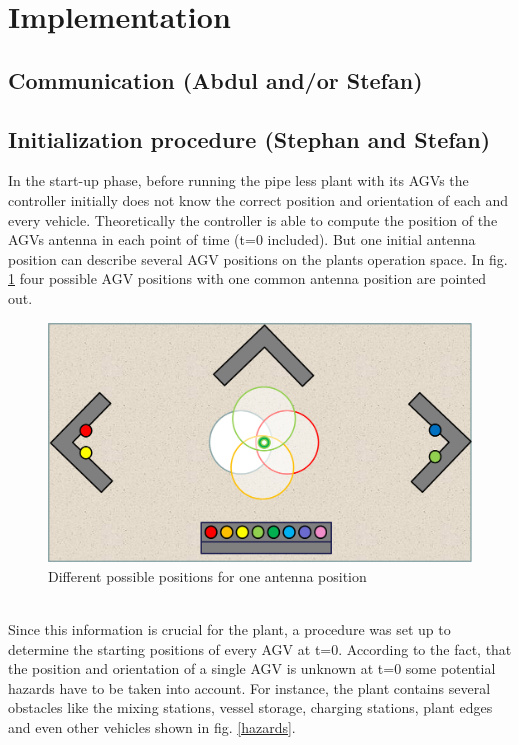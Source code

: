 \section{Implementation}\label{Sec_Imp}

\subsection{Communication (Abdul and/or Stefan)}

\subsection{Initialization procedure (Stephan and Stefan)}\label{Sec_Imp_Ini}
In the start-up phase, before running the pipe less plant with its AGVs the controller initially does not know the correct position and orientation of each and every vehicle. Theoretically the controller is able to compute the position of the AGVs antenna in each point of time (t=0 included). But one initial antenna position can describe several AGV positions on the plants operation space. In fig. \ref{possible_initial_positions} four possible AGV positions with one common antenna position are pointed out. \\
\begin{figure}[!htbp]
\centering
\includegraphics[width = 16cm]{Pictures/possible_initial_positions}
\caption{Different possible positions for one antenna position}
\label{possible_initial_positions}
\end{figure}\\
Since this information is crucial for the plant, a procedure was set up to determine the starting positions of every AGV at t=0.
According to the fact, that the position and orientation of a single AGV is unknown at t=0 some potential hazards have to be taken into account. For instance, the plant contains several obstacles like the mixing stations, vessel storage, charging stations, plant edges and even other vehicles shown in fig. \ref{hazards}.\\

